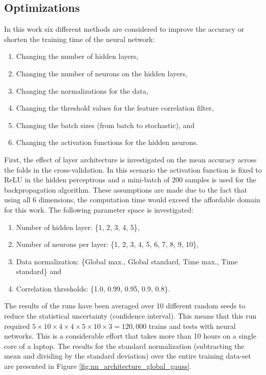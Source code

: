 \documentclass[paper=a4, fontsize=11pt]{scrartcl} %
\begin{document}
\subsection*{Optimizations}
In this work six different methods are considered to improve the accuracy or shorten the training time of the neural network:
\begin{enumerate}
	\item Changing the number of hidden layers,
	\item Changing the number of neurons on the hidden layers,
	\item Changing the normalizations for the data,
	\item Changing the threshold values for the feature correlation filter,
	\item Changing the batch sizes (from batch to stochastic), and
	\item Changing the activation functions for the hidden neurons.
\end{enumerate}
First, the effect of layer architecture is investigated on the mean accuracy across the folds in the cross-validation.
In this scenario the activation function is fixed to ReLU in the hidden perceptrons and a mini-batch of 200 samples is used for the backpropagation algorithm.
These assumptions are made due to the fact that using all 6 dimensions, the computation time would exceed the affordable domain for this work.
The following parameter space is investigated:
\begin{enumerate}
	\item Number of hidden layer: \{1, 2, 3, 4, 5\}, 
	\item Number of neurons per layer: \{1, 2, 3, 4, 5, 6, 7, 8, 9, 10\}, 
	\item Data normalization: \{Global max., Global standard, Time max., Time standard\} and
	\item Correlation thresholds: \{1.0, 0.99, 0.95, 0.9, 0.8\}.
\end{enumerate}
The results of the runs have been averaged over 10 different random seeds to reduce the statistical uncertainty (confidence interval). 
This means that this run required $5\times 10 \times 4 \times 4 \times 5 \times 10 \times 3 = 120, 000$ trains and tests with neural networks.
This is a considerable effort that takes more than 10 hours on a single core of a laptop.
The results for the standard normalization (subtracting the mean and dividing by the standard deviation) over the entire training data-set are presented in Figure \ref{fig:nn_architecture_global_gauss}.
\end{document}
